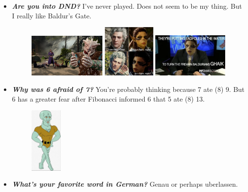\documentclass[11pt,letterpaper]{article}
\begin{document}
\begin{itemize}
\item {\bfseries\itshape Are you into DND?} I've never played. Does not seem to be my thing. But I really like Baldur's Gate.
	\begin{figure}[H]
	\centering
	\includegraphics[width=0.365\textwidth]{images/baldur.jpg}
	\includegraphics[width=0.25\textwidth]{images/baldur2.png}
	\includegraphics[width=0.36\textwidth]{images/baldur3.png}
	\end{figure}

\item {\bfseries\itshape Why was 6 afraid of 7?} You're probably thinking because 7 ate (8) 9. But 6 has a greater fear after Fibonacci informed 6 that 5 ate (8) 13. 
	\begin{figure}[H]
	\centering
	\includegraphics[width=0.15\textwidth]{images/handsomesquidward.jpg}
	\end{figure}

\item {\bfseries\itshape What's your favorite word in German?} Genau or perhaps uberlassen.
\end{itemize}
\end{document}
